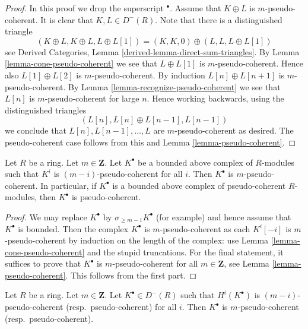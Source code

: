 \begin{proof}
In this proof we drop the superscript ${}^\bullet$.
Assume that $K \oplus L$ is $m$-pseudo-coherent.
It is clear that $K, L \in D^{-}(R)$.
Note that there is a distinguished triangle
$$
(K \oplus L, K \oplus L, L \oplus L[1]) =
(K, K, 0) \oplus (L, L, L \oplus L[1])
$$
see
Derived Categories, Lemma \ref{derived-lemma-direct-sum-triangles}.
By
Lemma \ref{lemma-cone-pseudo-coherent}
we see that $L \oplus L[1]$ is $m$-pseudo-coherent.
Hence also $L[1] \oplus L[2]$ is $m$-pseudo-coherent.
By induction $L[n] \oplus L[n + 1]$ is $m$-pseudo-coherent.
By
Lemma \ref{lemma-recognize-pseudo-coherent}
we see that $L[n]$ is $m$-pseudo-coherent for large $n$.
Hence working backwards, using the distinguished triangles
$$
(L[n], L[n] \oplus L[n - 1], L[n - 1])
$$
we conclude that $L[n], L[n - 1], \ldots, L$ are $m$-pseudo-coherent
as desired. The pseudo-coherent case follows from this and
Lemma \ref{lemma-pseudo-coherent}.
\end{proof}

\begin{lemma}
\label{lemma-complex-pseudo-coherent-modules}
Let $R$ be a ring. Let $m \in \mathbf{Z}$. Let $K^\bullet$ be a bounded
above complex of $R$-modules such that $K^i$ is $(m - i)$-pseudo-coherent
for all $i$. Then $K^\bullet$ is $m$-pseudo-coherent.
In particular, if $K^\bullet$ is a bounded above complex of
pseudo-coherent $R$-modules, then $K^\bullet$ is pseudo-coherent.
\end{lemma}

\begin{proof}
We may replace $K^\bullet$ by $\sigma_{\geq m - 1}K^\bullet$ (for example) and
hence assume that $K^\bullet$ is bounded.
Then the complex $K^\bullet$ is $m$-pseudo-coherent as each
$K^i[-i]$ is $m$-pseudo-coherent by induction on the length of the
complex: use Lemma \ref{lemma-cone-pseudo-coherent}
and the stupid truncations.
For the final statement, it suffices to prove that
$K^\bullet$ is $m$-pseudo-coherent for all $m \in \mathbf{Z}$, see
Lemma \ref{lemma-pseudo-coherent}.
This follows from the first part.
\end{proof}

\begin{lemma}
\label{lemma-cohomology-pseudo-coherent}
Let $R$ be a ring. Let $m \in \mathbf{Z}$.
Let $K^\bullet \in D^{-}(R)$ such that $H^i(K^\bullet)$ is
$(m - i)$-pseudo-coherent (resp.\ pseudo-coherent) for all $i$.
Then $K^\bullet$ is $m$-pseudo-coherent (resp.\ pseudo-coherent).
\end{lemma}

